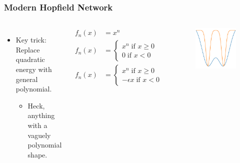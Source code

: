 \begin{frame}
    \frametitle{Modern Hopfield Network}
    \begin{columns}[c]
        \begin{itemize}
            \item Key trick: Replace quadratic energy with general polynomial.
            \begin{itemize}
                \item Heck, anything with a vaguely polynomial shape.
            \end{itemize}
        \end{itemize}

        \begin{align*}
            f_n\left( x \right) &= x^n \\
            f_n\left( x \right) &= \begin{cases}
                x^n \; \text{if } x\geq0 \\
                0 \; \text{if } x<0
            \end{cases} \\
            f_n\left( x \right) &= \begin{cases}
                x^n \; \text{if } x\geq0 \\
                -\epsilon x \; \text{if } x<0
            \end{cases}
        \end{align*}

        \begin{figure}[h]
            \includegraphics[width=\textwidth]{images/introduction_energywell03.png}
        \end{figure}
    \end{columns}
\end{frame}


